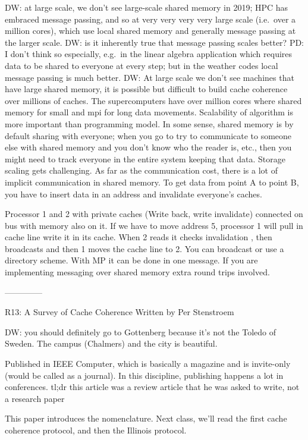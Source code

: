 DW: at large scale, we don't see large-scale shared memory in 2019; HPC has embraced message passing, and so at very very very very large scale (i.e.\ over a million cores), which use local shared memory and generally message passing at the larger scale.
DW: is it inherently true that message passing scales better?
PD: I don't think so especially, e.g.\ in the linear algebra application which requires data to be shared to everyone at every step; but in the weather codes local message passing is much better.
DW: At large scale we don’t see machines that have large shared memory, it is possible but difficult to build cache coherence over millions of caches. The supercomputers have over million cores where shared memory for small and mpi for long data movements. Scalability of algorithm is more important than programming model. In some sense, shared memory is by default sharing with everyone; when you go to try to communicate to someone else with shared memory and you don't know who the reader is, etc., then you might need to track everyone in the entire system keeping that data. Storage scaling gets challenging. 
As far as the communication cost, there is a lot of implicit communication in shared memory.
To get data from point A to point B, you have to insert data in an address and invalidate everyone's caches.

Processor 1 and 2 with private caches (Write back, write invalidate) connected on bus with memory also on it. If we have to move address 5, processor 1 will pull in cache line write it in its cache. When 2 reads it checks invalidation , then broadcasts and then 1 moves the cache line to 2. You can broadcast or use a directory scheme. With MP it can be done in one message.
If you are implementing messaging over shared memory extra round trips involved.


--------------

R13: A Survey of Cache Coherence
Written by Per Stenstroem

DW: you should definitely go to Gottenberg because it's not the Toledo of Sweden.
The campus (Chalmers) and the city is beautiful.

Published in IEEE Computer, which is basically a magazine and is invite-only (would be called as a journal).
In this discipline, publishing happens a lot in conferences.
tl;dr this article was a review article that he was asked to write, not a research paper

This paper introduces the nomenclature.
Next class, we'll read the first cache coherence protocol, and then the Illinois protocol.

